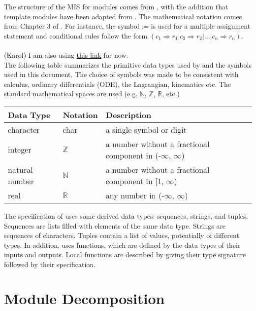 \documentclass[12pt, titlepage]{article}
\begin{document}
The structure of the MIS for modules comes from \citet{HoffmanAndStrooper1995},
with the addition that template modules have been adapted from
\cite{GhezziEtAl2003}.  The mathematical notation comes 
from Chapter 3 of \citet{HoffmanAndStrooper1995}.  
For instance, the symbol := is used for a multiple assignment statement and 
conditional rules follow the form 
$(c_1 \Rightarrow r_1 | c_2 \Rightarrow r_2 | ... | c_n \Rightarrow r_n )$.\\\\
(Karol) I am also using \href{https://proofwiki.org/wiki/Symbols:R}{this link}
for now.\\

The following table summarizes the primitive data types used by \progname and 
the symbols used in this document.
The choice of symbols was made to be consistent with calculus, ordinary
differentials (ODE), the Lagrangian, kinematics etc. The standard mathematical
spaces are used (e.g. $\mathbb{N}$, $\mathbb{Z}$, $\mathbb{R}$, etc.)

\begin{center}
\renewcommand{\arraystretch}{1.2}
\noindent 
\begin{tabular}{l l p{7.5cm}} 
\toprule 
\textbf{Data Type} & \textbf{Notation} & \textbf{Description}\\ 
\midrule
character & char & a single symbol or digit\\
integer & $\mathbb{Z}$ & a number without a fractional component in 
(-$\infty$, $\infty$) \\
natural number & $\mathbb{N}$ & a number without a fractional component in 
[1, $\infty$) \\
real & $\mathbb{R}$ & any number in (-$\infty$, $\infty$)\\
\bottomrule
\end{tabular} 
\end{center}

\noindent
The specification of \progname uses some derived data types: sequences, 
strings, and tuples. 
Sequences are lists filled with elements of the same data type. Strings
are sequences of characters. Tuples contain a list of values, potentially of
different types. In addition, \progname uses functions, which
are defined by the data types of their inputs and outputs. Local functions are
described by giving their type signature followed by their specification.

\section{Module Decomposition}
\end{document}
